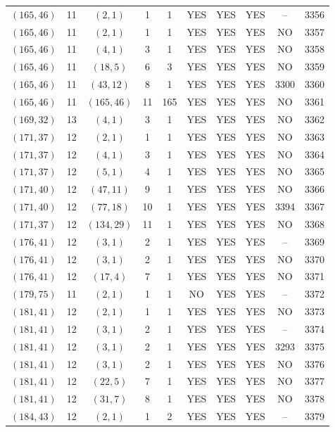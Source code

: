 \begin{longtable}{|c|c|c|c|c|c|c|c|c|c|}
$(165, 46)$ & 11 & $(2, 1)$ & 1 & 1 & YES & YES & YES & -- & 3356\\
$(165, 46)$ & 11 & $(2, 1)$ & 1 & 1 & YES & YES & YES & NO & 3357\\
$(165, 46)$ & 11 & $(4, 1)$ & 3 & 1 & YES & YES & YES & NO & 3358\\
$(165, 46)$ & 11 & $(18, 5)$ & 6 & 3 & YES & YES & YES & NO & 3359\\
$(165, 46)$ & 11 & $(43, 12)$ & 8 & 1 & YES & YES & YES & 3300 & 3360\\
$(165, 46)$ & 11 & $(165, 46)$ & 11 & 165 & YES & YES & YES & NO & 3361\\
$(169, 32)$ & 13 & $(4, 1)$ & 3 & 1 & YES & YES & YES & NO & 3362\\
$(171, 37)$ & 12 & $(2, 1)$ & 1 & 1 & YES & YES & YES & NO & 3363\\
$(171, 37)$ & 12 & $(4, 1)$ & 3 & 1 & YES & YES & YES & NO & 3364\\
$(171, 37)$ & 12 & $(5, 1)$ & 4 & 1 & YES & YES & YES & NO & 3365\\
$(171, 40)$ & 12 & $(47, 11)$ & 9 & 1 & YES & YES & YES & NO & 3366\\
$(171, 40)$ & 12 & $(77, 18)$ & 10 & 1 & YES & YES & YES & 3394 & 3367\\
$(171, 37)$ & 12 & $(134, 29)$ & 11 & 1 & YES & YES & YES & NO & 3368\\
$(176, 41)$ & 12 & $(3, 1)$ & 2 & 1 & YES & YES & YES & -- & 3369\\
$(176, 41)$ & 12 & $(3, 1)$ & 2 & 1 & YES & YES & YES & NO & 3370\\
$(176, 41)$ & 12 & $(17, 4)$ & 7 & 1 & YES & YES & YES & NO & 3371\\
$(179, 75)$ & 11 & $(2, 1)$ & 1 & 1 & NO & YES & YES & -- & 3372\\
$(181, 41)$ & 12 & $(2, 1)$ & 1 & 1 & YES & YES & YES & NO & 3373\\
$(181, 41)$ & 12 & $(3, 1)$ & 2 & 1 & YES & YES & YES & -- & 3374\\
$(181, 41)$ & 12 & $(3, 1)$ & 2 & 1 & YES & YES & YES & 3293 & 3375\\
$(181, 41)$ & 12 & $(3, 1)$ & 2 & 1 & YES & YES & YES & NO & 3376\\
$(181, 41)$ & 12 & $(22, 5)$ & 7 & 1 & YES & YES & YES & NO & 3377\\
$(181, 41)$ & 12 & $(31, 7)$ & 8 & 1 & YES & YES & YES & NO & 3378\\
$(184, 43)$ & 12 & $(2, 1)$ & 1 & 2 & YES & YES & YES & -- & 3379\\

\end{longtable}
